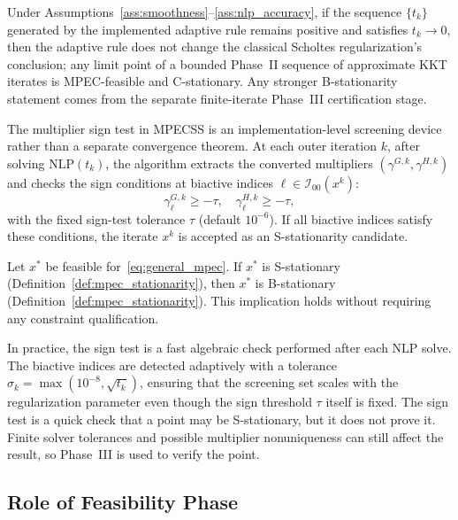 \begin{lemma}
\label{lem:adaptive_t_convergence}
Under Assumptions~\ref{ass:smoothness}--\ref{ass:nlp_accuracy}, if the
sequence $\{t_k\}$ generated by the implemented adaptive rule remains
positive and satisfies $t_k \to 0$, then the adaptive rule does not
change the classical Scholtes regularization's conclusion; any limit point
of a bounded Phase~II sequence of approximate KKT iterates is
MPEC-feasible and C-stationary. Any stronger B-stationarity statement
comes from the separate finite-iterate Phase~III certification stage.
\end{lemma}

The multiplier sign test in MPECSS is an implementation-level screening
device rather than a separate convergence theorem. At each
outer iteration $k$, after solving $\text{NLP}(t_k)$, the algorithm
extracts the converted multipliers $(\gamma^{G,k}, \gamma^{H,k})$ and
checks the sign conditions at biactive indices
$\ell \in \mathcal{I}_{00}(x^k)$:
\begin{equation}
  \gamma^{G,k}_\ell \geq -\tau, \quad \gamma^{H,k}_\ell \geq -\tau,
  \label{eq:sign_test_conditions}
\end{equation}
with the fixed sign-test tolerance $\tau$ (default $10^{-6}$). If all biactive indices satisfy
these conditions, the iterate $x^k$ is accepted as an
S-stationarity candidate.

\begin{theorem}
\label{thm:s_implies_b}
Let $x^*$ be feasible for~\eqref{eq:general_mpec}. If $x^*$ is S-stationary (Definition~\ref{def:mpec_stationarity}), then $x^*$ is B-stationary (Definition~\ref{def:mpec_stationarity}). This implication holds without requiring any constraint qualification.
\end{theorem}

In practice, the sign test is a fast algebraic check performed after
each NLP solve. The biactive indices are detected adaptively with a
tolerance $\sigma_k = \max(10^{-8}, \sqrt{t_k})$, ensuring that the
screening set scales with the regularization parameter even though the
sign threshold $\tau$ itself is fixed. The sign test is a quick check
that a point may be S-stationary, but it does not prove it. Finite
solver tolerances and possible multiplier nonuniqueness can still
affect the result, so Phase~III is used to verify the point.

\subsection{Role of Feasibility Phase}
\label{sec:restoration_convergence}

